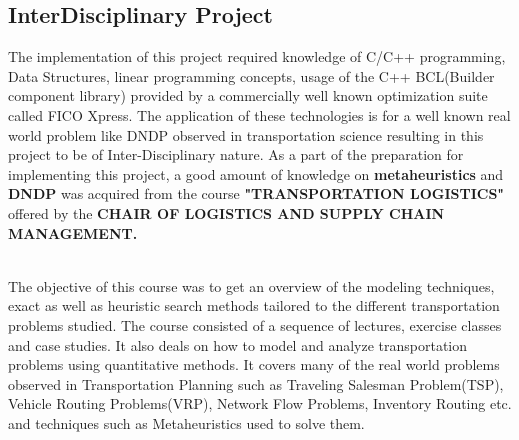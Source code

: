 \documentclass[a4paper, 12pt]{article}
\begin{document}
\begin{itemize}
\end{itemize}


\subsection{InterDisciplinary Project}
The implementation of this project required knowledge of C/C++ programming, Data Structures, linear programming concepts, usage of the C++ BCL(Builder component library) provided by a commercially well known optimization suite called FICO Xpress. The application of these technologies is for a well known real world problem like DNDP observed in transportation science resulting in this project to be of Inter-Disciplinary nature. As a part of the preparation for implementing this project, a good amount of knowledge on \textbf{metaheuristics} and \textbf{DNDP} was acquired from the course \textbf{"TRANSPORTATION LOGISTICS"} offered by the \textbf{CHAIR OF LOGISTICS AND SUPPLY CHAIN MANAGEMENT.}\par
\noindent
\\
The objective of this course was to get an overview of the modeling techniques, exact as well as heuristic search methods tailored to the different transportation problems studied. The course consisted of a sequence of lectures, exercise classes and case studies. It also deals on how to model and analyze transportation problems using quantitative methods. It covers many of the real world problems observed in Transportation Planning such as Traveling Salesman Problem(TSP), Vehicle Routing Problems(VRP), Network Flow Problems, Inventory Routing etc. and techniques such as Metaheuristics used to solve them.\par
\end{document}
